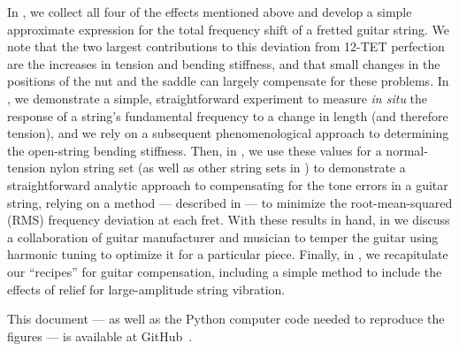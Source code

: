 In , we collect all four of the effects mentioned above and develop a simple approximate expression for the total frequency shift of a fretted guitar string. We note that the two largest contributions to this deviation from 12-TET perfection are the increases in tension and bending stiffness, and that small changes in the positions of the nut and the saddle can largely compensate for these problems. In , we demonstrate a simple, straightforward experiment to measure \emph{in situ} the response of a string's fundamental frequency to a change in length (and therefore tension), and we rely on a subsequent phenomenological approach to determining the open-string bending stiffness. Then, in , we use these values for a normal-tension nylon string set (as well as other string sets in ) to demonstrate a straightforward analytic approach to compensating for the tone errors in a guitar string, relying on a method --- described in  --- to minimize the root-mean-squared (RMS) frequency deviation at each fret. With these results in hand, in  we discuss a collaboration of guitar manufacturer and musician to temper the guitar using harmonic tuning to optimize it for a particular piece. Finally, in , we recapitulate our ``recipes'' for guitar compensation, including a simple method to include the effects of relief for large-amplitude string vibration.

This document --- as well as the Python computer code needed to reproduce the figures --- is available at GitHub~\cite{ref:github2021rgb}. 